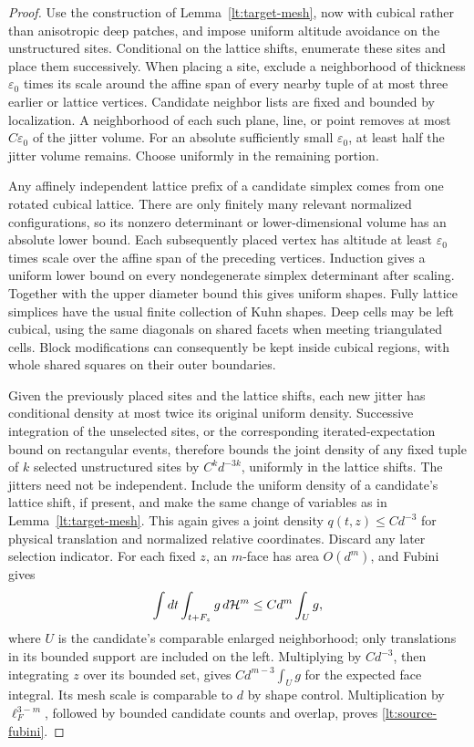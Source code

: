 \begin{proof}
Use the construction of Lemma~\ref{lt:target-mesh}, now with
cubical rather than anisotropic deep patches, and impose
uniform altitude avoidance on the unstructured sites.  Conditional
on the lattice shifts, enumerate these sites and place them
successively.  When placing a site, exclude a neighborhood of
thickness $\varepsilon_0$ times its scale around the affine span
of every nearby tuple of at most three earlier or lattice
vertices.  Candidate neighbor lists are fixed and bounded by
localization.  A neighborhood of each such plane, line, or
point removes at most $C\varepsilon_0$ of the jitter volume.
For an absolute sufficiently small $\varepsilon_0$, at least
half the jitter volume remains.  Choose uniformly in the
remaining portion.

Any affinely independent lattice prefix of a candidate simplex
comes from one rotated cubical lattice.  There are only finitely
many relevant normalized configurations, so its nonzero
determinant or lower-dimensional volume has an absolute lower
bound.  Each subsequently placed vertex has altitude at least
$\varepsilon_0$ times scale over the affine span of the preceding
vertices.  Induction gives a uniform lower bound on every
nondegenerate simplex determinant after scaling.  Together with
the upper diameter bound this gives uniform shapes.  Fully
lattice simplices have the usual finite collection of Kuhn
shapes.  Deep cells may be left cubical, using the same
diagonals on shared facets when meeting triangulated cells.
Block modifications can consequently be kept inside cubical
regions, with whole shared squares on their outer boundaries.

Given the previously placed sites and the lattice shifts, each
new jitter has conditional density at most twice its original
uniform density.  Successive integration of the unselected sites,
or the corresponding iterated-expectation bound on rectangular
events, therefore bounds the joint density of any fixed tuple of
$k$ selected unstructured sites by $C^k d^{-3k}$, uniformly in
the lattice shifts.  The jitters need not be independent.  Include the uniform density of a candidate's lattice shift, if
present, and make the same change of variables as in
Lemma~\ref{lt:target-mesh}.  This again gives a joint density
$q(t,z)\leq Cd^{-3}$ for physical translation and normalized
relative coordinates.  Discard any later selection indicator.
For each fixed $z$, an $m$-face has area $O(d^m)$, and Fubini gives
\[
 \int dt\int_{t+F_z}g\,d\mathcal H^m
       \leq Cd^m\int_{U}g,
\]
where $U$ is the candidate's comparable enlarged neighborhood;
only translations in its bounded support are included on the
left.  Multiplying by $Cd^{-3}$, then integrating $z$ over its
bounded set, gives $Cd^{m-3}\int_U g$ for the expected face
integral.  Its mesh scale is comparable to $d$ by shape control.
Multiplication by $\ell_F^{3-m}$, followed by bounded candidate
counts and overlap, proves \eqref{lt:source-fubini}.


\end{proof}
